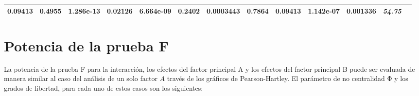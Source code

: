 \documentclass[]{book}
\theoremstyle{definition}
\theoremstyle{definition}
\theoremstyle{definition}
\theoremstyle{remark}
\begin{document}
\begin{longtable}[]{@{}lllllllllllll@{}}
\begin{minipage}[t]{0.05\columnwidth}
0.09413\strut
\end{minipage} & \begin{minipage}[t]{0.05\columnwidth}\raggedright
0.4955\strut
\end{minipage} & \begin{minipage}[t]{0.06\columnwidth}\raggedright
\textbf{1.286e-13}\strut
\end{minipage} & \begin{minipage}[t]{0.05\columnwidth}\raggedright
\textbf{0.02126}\strut
\end{minipage} & \begin{minipage}[t]{0.05\columnwidth}\raggedright
\textbf{6.664e-09}\strut
\end{minipage} & \begin{minipage}[t]{0.05\columnwidth}\raggedright
0.2402\strut
\end{minipage} & \begin{minipage}[t]{0.06\columnwidth}\raggedright
\textbf{0.0003443}\strut
\end{minipage} & \begin{minipage}[t]{0.05\columnwidth}\raggedright
0.7864\strut
\end{minipage} & \begin{minipage}[t]{0.05\columnwidth}\raggedright
0.09413\strut
\end{minipage} & \begin{minipage}[t]{0.05\columnwidth}\raggedright
\textbf{1.142e-07}\strut
\end{minipage} & \begin{minipage}[t]{0.06\columnwidth}\raggedright
\textbf{0.001336}\strut
\end{minipage} & \begin{minipage}[t]{0.05\columnwidth}\raggedright
\emph{54.75}\strut
\end{minipage}\tabularnewline
\bottomrule
\end{longtable}

\hypertarget{potencia-de-la-prueba-f-1}{%
\section{Potencia de la prueba F}\label{potencia-de-la-prueba-f-1}}

La potencia de la prueba F para la interacción, los efectos del factor
principal A y los efectos del factor principal B puede ser evaluada de
manera similar al caso del análisis de un solo factor \(A\) través de
los gráficos de Pearson-Hartley. El parámetro de no centralidad Φ y los
grados de libertad, para cada uno de estos casos son los siguientes:
\end{document}
